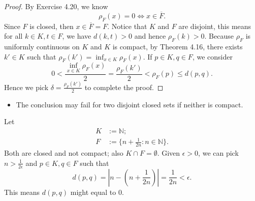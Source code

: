 \begin{Exercise}
	\begin{proof}
		By Exercise 4.20, we know
		$$
		\rho_F(x) = 0 \iff x\in \overline{F}.
		$$
		Since $F$ is closed, then $x\in \overline{F} = F$. Notice that $K$ and $F$ are disjoint, this means for all $k\in K, t\in F$, we have $d(k,t) > 0$ and hence $\rho_F(k) > 0$. Because $\rho_F$ is uniformly continuous on $K$ and $K$ is compact, by Theorem 4.16, there exists $k'\in K$ such that $\rho_F(k') = \inf_{x\in K} \rho_F(x)$.
		If $p\in K, q\in F$, we consider
		$$
		0 < \frac{\inf_{x\in K} \rho_F(x)}{2}
		= \frac{\rho_F(k')}{2} 
		< \rho_F(p)
		\leq d(p,q).
		$$
		Hence we pick $\delta = \frac{\rho_F(k')}{2}$ to complete the proof.
	\end{proof}
	
	\begin{itemize}
		\item The conclusion may fail for two disjoint closed sets if neither is compact.
	\end{itemize}
	\begin{solution}
		Let
		\begin{align*}
		K &:= \mathbb{N};\\
		F &:= \{n+\frac{1}{2n}:n\in\mathbb{N} \}.
		\end{align*}
		Both are closed and not compact; also $K\cap F = \emptyset$. Given $\epsilon>0$, we can pick $n>\frac{1}{2\epsilon}$ and $p\in K,q\in F$ such that
		$$
		d(p,q) = \left| n-\left(n+\frac{1}{2n}\right) \right|
		= \frac{1}{2n}
		< \epsilon.
		$$
		This means $d(p,q)$ might equal to $0$.
	\end{solution}
\end{Exercise}